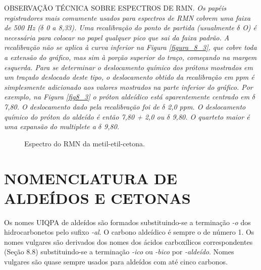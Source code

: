 \par\bigskip
\noindent OBSERVAÇÃO TÉCNICA SOBRE ESPECTROS DE RMN. \textit{Os papéis registradores mais comumente usados para espectros de RMN cobrem uma faixa de 500 Hz ($\delta$ 0 a 8,33). Uma recalibração do ponto de partida (usualmente $\delta$ O) é necessária para colocar no papel qualquer pico que sai da faixa padrão. A recalibração não se aplica à curva inferior na Figura \ref{figura_8_3}, que cobre toda a extensão do gráfico, mas sim à porção superior do traço, começando na margem esquerda. Para se determinar o deslocamento químico dos prótons mostrados em um traçado deslocado deste tipo, o deslocamento obtido da recalibração em ppm é simplesmente adicionado aos valores mostrados na parte inferior do gráfico. Por exemplo, na Figura \ref{fig8_3} o próton aldeídico está aparentemente centrado em $\delta$ 7,80. O deslocamento dado pela recalibração foi de $\delta$ 2,0 ppm. O deslocamento químico do próton do aldeído é então 7,80 + 2,0 ou $\delta$ 9,80. O quarteto maior é uma expansão do multiplete a $\delta$ 9,80.}
\par\bigskip

\begin{figure}[H]
    \centering
    \caption{Espectro do RMN da metil-etil-cetona.}
    \label{fig8_4}
\end{figure}

\section{NOMENCLATURA DE ALDEÍDOS E CETONAS}

Os nomes UIQPA de aldeídos são formados substituindo-se a terminação \textit{-o} dos hidrocarbonetos pelo sufixo \textit{-al}. O carbono aldeídico é sempre o de número 1. Os nomes vulgares são derivados dos nomes dos ácidos carboxílicos correspondentes (Seção 8.8) substituindo-se a terminação \textit{-ico} ou \textit{-bico} por \textit{-aldeído}. Nomes vulgares são quase sempre usados para aldeídos com até cinco carbonos.

\begin{tightcenter}
    \chemnameinit{}
    \qquad
    \chemnameinit{}
    \qquad
    \chemnameinit{}
\end{tightcenter}

